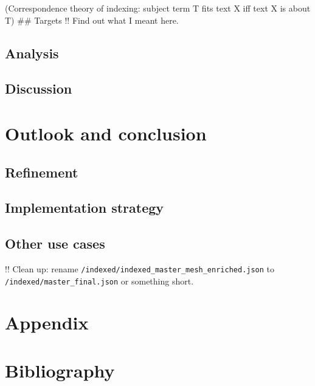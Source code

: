 (Correspondence theory of indexing: subject term T fits text X iff text
X is about T) \#\# Targets !! Find out what I meant here.

\hypertarget{analysis-2}{%
\subsection{Analysis}\label{analysis-2}}

\hypertarget{discussion-1}{%
\subsection{Discussion}\label{discussion-1}}

\hypertarget{outlook-and-conclusion}{%
\section{Outlook and conclusion}\label{outlook-and-conclusion}}

\hypertarget{refinement}{%
\subsection{Refinement}\label{refinement}}

\hypertarget{implementation-strategy}{%
\subsection{Implementation strategy}\label{implementation-strategy}}

\hypertarget{other-use-cases}{%
\subsection{Other use cases}\label{other-use-cases}}

!! Clean up: rename
\texttt{/indexed/indexed\_master\_mesh\_enriched.json} to
\texttt{/indexed/master\_final.json} or something short.

\hypertarget{appendix}{%
\section{Appendix}\label{appendix}}

\hypertarget{bibliography}{%
\section{Bibliography}\label{bibliography}}

